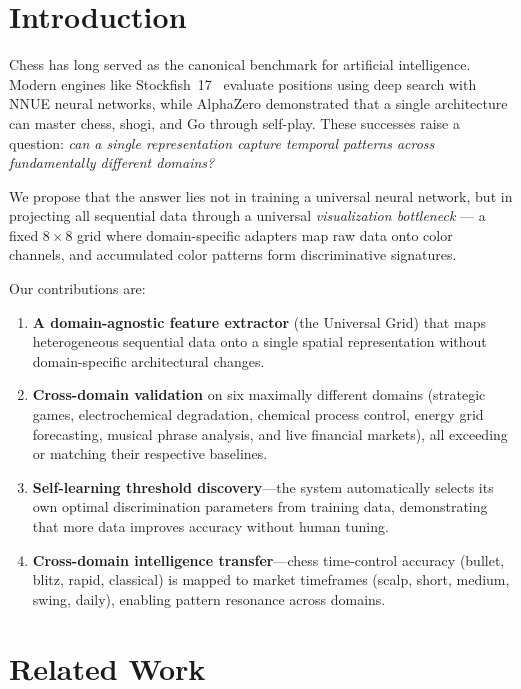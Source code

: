\documentclass[11pt,a4paper]{article}
\begin{document}
\section{Introduction}

Chess has long served as the canonical benchmark for artificial intelligence.
Modern engines like Stockfish~17~\citep{stockfish2024} evaluate positions using
deep search with NNUE neural networks, while AlphaZero demonstrated that a single
architecture can master chess, shogi, and Go through self-play. These successes
raise a question: \emph{can a single representation capture temporal patterns
across fundamentally different domains?}

We propose that the answer lies not in training a universal neural network, but in
projecting all sequential data through a universal \emph{visualization bottleneck}
--- a fixed $8\times8$ grid where domain-specific adapters map raw data onto color
channels, and accumulated color patterns form discriminative signatures.

Our contributions are:
\begin{enumerate}
    \item \textbf{A domain-agnostic feature extractor} (the Universal Grid) that maps
    heterogeneous sequential data onto a single spatial representation without
    domain-specific architectural changes.
    \item \textbf{Cross-domain validation} on six maximally different domains
    (strategic games, electrochemical degradation, chemical process control, energy
    grid forecasting, musical phrase analysis, and live financial markets), all
    exceeding or matching their respective baselines.
    \item \textbf{Self-learning threshold discovery}---the system automatically selects
    its own optimal discrimination parameters from training data, demonstrating that
    more data improves accuracy without human tuning.
    \item \textbf{Cross-domain intelligence transfer}---chess time-control accuracy
    (bullet, blitz, rapid, classical) is mapped to market timeframes (scalp, short,
    medium, swing, daily), enabling pattern resonance across domains.
\end{enumerate}

\section{Related Work}
\end{document}
